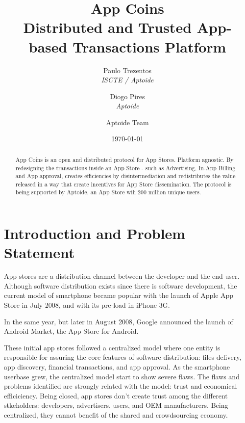 \documentclass[12pt, a4paper, twoside, titlepage]{article}
\title{App Coins \\ Distributed and Trusted App-based Transactions Platform}
\author{Paulo Trezentos  \\
  {\em ISCTE / Aptoide}  \\
  \and 
  Diogo Pires \\
  {\em Aptoide} \\
  \and
  Aptoide Team
  }
\date{\today}
\begin{document}
\maketitle


\begin{abstract}
App Coins is an open and distributed protocol for App Stores. Platform agnostic. 
By redesigning the transactions inside an App Store - such as Advertising, In-App Billing and App approval, creates efficiencies by disintermediation and redistributes the value released in a way that create incentives for App Store dissemination.
The protocol is being supported by Aptoide, an App Store wih 200 million unique users. 
\end{abstract}




\section{Introduction and Problem Statement}



App stores are a distribution channel between the developer and the end user. Although software distribution exists since there is software development, the current model of smartphone became popular with the launch of Apple App Store in July 2008, and with its pre-load in iPhone 3G.

In the same year, but later in August 2008, Google announced the launch of Android Market\cite{wiki:market}, the App Store for Android.

These initial app stores followed a centralized model where one entity is responsible for assuring the core features of software distribution: files delivery, app discovery, financial transactions, and app approval. As the smartphone userbase grew, the centralized model start to show severe flaws. The flaws and problems identified are strongly related with the model: trust and economical efficiciency. Being closed, app stores don't create trust among the different stkeholders: developers, advertisers, users, and OEM manufacturers. Being centralized, they cannot benefit of the shared and crowdsourcing economy.
\end{document}
